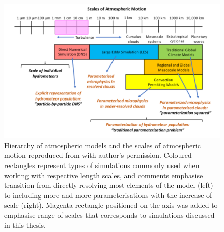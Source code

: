 
\begin{figure}
\centering
\includegraphics[width=13cm]{figures/0-01_atmo-scales.png}
\caption{
Hierarchy of atmospheric models and the scales of atmospheric motion reproduced from \textcite{Morrison2020} with author's permission.
Coloured rectangles represent types of simulations commonly used when working with respective length scales, and comments emphasise transition from directly resolving most elements of the model (left) to including more and more parameterisations with the increase of scale (right).
Magenta rectangle positioned on the axis was added to emphasise range of scales that corresponds to simulations discussed in this thesis.}
\label{fig:atmo-scales}
\end{figure}